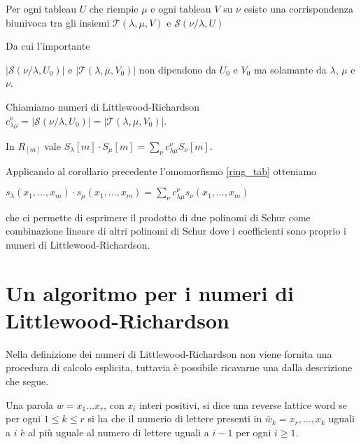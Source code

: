 \begin{prop}
Per ogni tableau $U$ che riempie $\mu$ e ogni tableau $V$ su $\nu$
esiste una corrispondenza biunivoca tra gli insiemi $\mathcal{T}(\lambda, \mu, V)$
e $\mathcal{S}(\nu/\lambda, U)$
\end{prop}

Da cui l'importante

\begin{cor}
$ | \mathcal{S}(\nu/\lambda, U_0) |$ e $| \mathcal{T}(\lambda, \mu,
  V_0) |$ non dipendono da $U_0$ e $V_0$ ma solamante da $\lambda$,
  $\mu$ e $\nu$.
\end{cor} 

\begin{defn}
Chiamiamo numeri di Littlewood-Richardson $ c_{\lambda \mu}^{\nu} = |
\mathcal{S}(\nu/\lambda, U_0) | = | \mathcal{T}(\lambda, \mu, V_0) |$.
\end{defn}

\begin{cor}
In $R_{[m]}$ vale $S_{\lambda}[m] \cdot S_{\mu}[m] =
\sum\limits_{\nu} c_{\lambda \mu}^{\nu} S_{\nu}[m]$.
\end{cor}

\begin{oss}
Applicando al corollario precedente l'omomorfismo \eqref{ring_tab}
otteniamo
\begin{center}\begin{math}
s_{\lambda}(x_1,\ldots,x_m) \cdot s_{\mu}(x_1,\ldots,x_m) =
\sum\limits_{\nu} c_{\lambda \mu}^{\nu} s_{\nu}(x_1,\ldots,x_m)
\end{math}\end{center}
che ci permette di esprimere il prodotto di due polinomi di Schur come
combinazione lineare di altri polinomi di Schur dove i coefficienti
sono proprio i numeri di Littlewood-Richardson.
\end{oss}

\section{Un algoritmo per i numeri di Littlewood-Richardson}
Nella definizione dei numeri di Littlewood-Richardson non viene
fornita una procedura di calcolo esplicita, tuttavia \`e possibile
ricavarne una dalla descrizione che segue.

\begin{defn}
Una parola $w=x_1\ldots x_r$, con $x_i$ interi positivi, si dice una reverse lattice word se per
ogni $1 \leq k \leq r$ si ha che il numerio di lettere presenti in
$\bar w_k = x_r,\ldots,x_k$ uguali a $i$ \`e
al pi\`u uguale al numero di lettere uguali a $i-1$ per ogni $i \geq
1$.
\end{defn}

